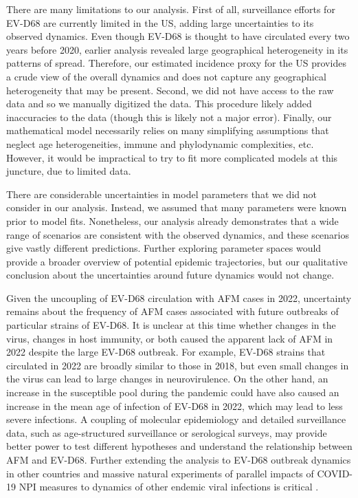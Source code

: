 \documentclass[12pt]{article}
\begin{document}
There are many limitations to our analysis.
First of all, surveillance efforts for EV-D68 are currently limited in the US, adding large uncertainties to its observed dynamics.
Even though EV-D68 is thought to have circulated every two years before 2020, earlier analysis revealed large geographical heterogeneity in its patterns of spread.
Therefore, our estimated incidence proxy for the US provides a crude view of the overall dynamics and does not capture any geographical heterogeneity that may be present.
Second, we did not have access to the raw data and so we manually digitized the data.
This procedure likely added inaccuracies to the data (though this is likely not a major error).
Finally, our mathematical model necessarily relies on many simplifying assumptions that neglect age heterogeneities, immune and phylodynamic complexities, etc.
However, it would be impractical to try to fit more complicated models at this juncture, due to limited data.

There are considerable uncertainties in model parameters that we did not consider in our analysis.
Instead, we assumed that many parameters were known prior to model fits.
Nonetheless, our analysis already demonstrates that a wide range of scenarios are consistent with the observed dynamics, and
these scenarios give vastly different predictions.
Further exploring parameter spaces would provide a broader overview of potential epidemic trajectories, but our qualitative conclusion about the uncertainties around future dynamics would not change.

Given the uncoupling of EV-D68 circulation with AFM cases in 2022, uncertainty remains about the frequency of AFM cases associated with future outbreaks of particular strains of EV-D68.
It is unclear at this time whether changes in the virus, changes in host immunity, or both caused the apparent lack of AFM in 2022 despite the large EV-D68 outbreak.
For example, EV-D68 strains that circulated in 2022 are broadly similar to those in 2018, but even small changes in the virus can lead to large changes in neurovirulence.
On the other hand, an increase in the susceptible pool during the pandemic could have also caused an increase in the mean age of infection of EV-D68 in 2022, which may lead to less severe infections.
A coupling of molecular epidemiology and detailed surveillance data, such as age-structured surveillance or serological surveys, may provide better power to test different hypotheses and understand the relationship between AFM and EV-D68.
Further extending the analysis to EV-D68 outbreak dynamics in other countries and massive natural experiments of parallel impacts of COVID-19 NPI measures to dynamics of other endemic viral infections is critical \citep{baker2020impact}.
\end{document}
